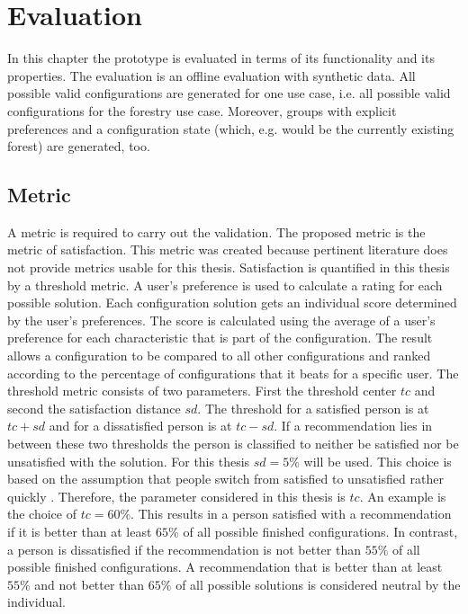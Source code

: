 \chapter{Evaluation}
\label{ch:Evaluation}

In this chapter the prototype is evaluated in terms of its functionality and its properties. The evaluation is an offline evaluation with synthetic data. All possible valid configurations are generated for one use case, i.e. all possible valid configurations for the forestry use case. Moreover, groups with explicit preferences and a configuration state (which, e.g. would be the currently existing forest) are generated, too.

\section{Metric}
\label{sec:Evaluation:Metrics}

A metric is required to carry out the validation. The proposed metric is the metric of satisfaction. This metric was created because pertinent literature does not provide metrics usable for this thesis. Satisfaction is quantified in this thesis by a threshold metric. A user's preference is used to calculate a rating for each possible solution. Each configuration solution gets an individual score determined by the user's preferences. The score is calculated using the average of a user's preference for each characteristic that is part of the configuration. The result allows a configuration to be compared to all other configurations and ranked according to the percentage of configurations that it beats for a specific user. The threshold metric consists of two parameters. First the threshold center $tc$ and second the satisfaction distance $sd$. The threshold for a satisfied person is at $tc + sd$ and for a dissatisfied person is at $tc - sd$. If a recommendation lies in between these two thresholds the person is classified to neither be satisfied nor be unsatisfied with the solution. For this thesis $sd=5\%$ will be used. This choice is based on the assumption that people switch from satisfied to unsatisfied rather quickly . Therefore, the parameter considered in this thesis is $tc$. An example is the choice of $tc = 60\%$. This results in a person satisfied with a recommendation if it is better than at least $65\%$ of all possible finished configurations. In contrast, a person is dissatisfied if the recommendation is not better than $55\%$ of all possible finished configurations. A recommendation that is better than at least $55\%$ and not better than $65\%$ of all possible solutions is considered neutral by the individual.

